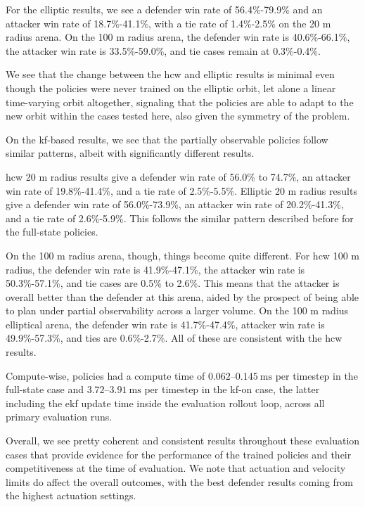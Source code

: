 For the elliptic results, we see a defender win rate of 56.4\%-79.9\% and an attacker win rate of 18.7\%-41.1\%, with a tie rate of 1.4\%-2.5\% on the 20 m radius arena. On the 100 m radius arena, the defender win rate is 40.6\%-66.1\%, the attacker win rate is 33.5\%-59.0\%, and tie cases remain at 0.3\%-0.4\%.


We see that the change between the \acs{hcw} and elliptic results is minimal even though the policies were never trained on the elliptic orbit, let alone a linear time-varying orbit altogether, signaling that the policies are able to adapt to the new orbit within the cases tested here, also given the symmetry of the problem.

On the \acs{kf}-based results, we see that the partially observable policies follow similar patterns, albeit with significantly different results.

\acs{hcw} 20 m radius results give a defender win rate of 56.0\% to 74.7\%, an attacker win rate of 19.8\%-41.4\%, and a tie rate of 2.5\%-5.5\%. Elliptic 20 m radius results give a defender win rate of 56.0\%-73.9\%, an attacker win rate of 20.2\%-41.3\%, and a tie rate of 2.6\%-5.9\%. This follows the similar pattern described before for the full-state policies.

On the 100 m radius arena, though, things become quite different. For \acs{hcw} 100 m radius, the defender win rate is 41.9\%-47.1\%, the attacker win rate is 50.3\%-57.1\%, and tie cases are 0.5\% to 2.6\%. This means that the attacker is overall better than the defender at this arena, aided by the prospect of being able to plan under partial observability across a larger volume. On the 100 m radius elliptical arena, the defender win rate is 41.7\%-47.4\%, attacker win rate is 49.9\%-57.3\%, and ties are 0.6\%-2.7\%. All of these are consistent with the \acs{hcw} results.

Compute-wise, policies had a compute time of $0.062$--$0.145~\mathrm{ms}$ per timestep
in the full-state case and $3.72$--$3.91~\mathrm{ms}$ per timestep in the \acs{kf}-on case, the latter including the \acs{ekf} update time inside the evaluation rollout loop,
across all primary evaluation runs.

Overall, we see pretty coherent and consistent results throughout these evaluation cases that provide evidence for the performance of the trained policies and their competitiveness at the time of evaluation. We note that actuation and velocity limits do affect the overall outcomes, with the best defender results coming from the highest actuation settings.

